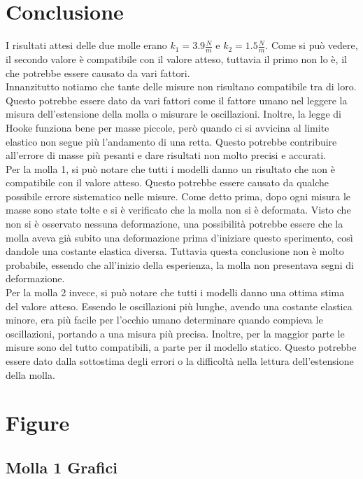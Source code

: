\documentclass[a4paper]{article}
\begin{document}
{\section{Conclusione}
I risultati attesi delle due molle erano $k_1 = 3.9 \frac{N}{m}$ e $k_2 = 1.5 \frac{N}{m}$. Come si può vedere, il secondo valore è compatibile con il valore atteso, tuttavia il primo non lo è, il che potrebbe essere causato da vari fattori. \\
Innanzitutto notiamo che tante delle misure non risultano compatibile tra di loro. Questo potrebbe essere dato da vari fattori come il fattore umano nel leggere la misura dell'estensione della molla o misurare le oscillazioni. Inoltre, la legge di Hooke funziona bene per masse piccole, però quando ci si avvicina al limite elastico non segue più l'andamento di una retta. Questo potrebbe contribuire all'errore di masse più pesanti e dare risultati non molto precisi e accurati. \\
Per la molla 1, si può notare che tutti i modelli danno un risultato che non è compatibile con il valore atteso. Questo potrebbe essere causato da qualche possibile errore sistematico nelle misure. Come detto prima, dopo ogni misura le masse sono state tolte e si è verificato che la molla non si è deformata. Visto che non si è osservato nessuna deformazione, una possibilità potrebbe essere che la molla aveva già subito una deformazione prima d'iniziare questo sperimento, così dandole una costante elastica diversa. Tuttavia questa conclusione non è molto probabile, essendo che all'inizio della esperienza, la molla non presentava segni di deformazione. \\
Per la molla 2 invece, si può notare che tutti i modelli danno una ottima stima del valore atteso. Essendo le oscillazioni più lunghe, avendo una costante elastica minore, era più facile per l'occhio umano determinare quando compieva le oscillazioni, portando a una misura più precisa. Inoltre, per la maggior parte le misure sono del tutto compatibili, a parte per il modello statico. Questo potrebbe essere dato dalla sottostima degli errori o la difficoltà nella lettura dell'estensione della molla.

\newpage
\section{Figure}
\subsection{Molla 1 Grafici}
}
\end{document}
